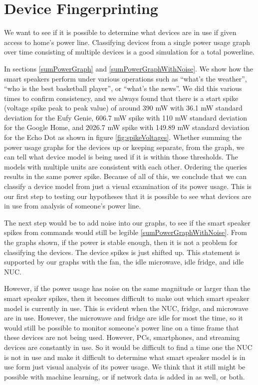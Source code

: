 \section{Device Fingerprinting}
We want to see if it is possible to determine what devices are in use if given access to home's power line. Classifying devices from a single power usage graph over time consisting of multiple devices is a good simulation for a total powerline.

In sections \ref{sumPowerGraph} and \ref{sumPowerGraphWithNoise}. We show how the smart speakers perform under various operations such as ``what's the weather'', ``who is the best basketball player'', or ``what's the news''. We did this various times to confirm consistency, and we always found that there is a start spike (voltage spike peak to peak value) of around 390 mW with 36.1 mW standard deviation for the Eufy Genie, 606.7 mW spike with 110 mW standard deviation for the Google Home, and 2026.7 mW spike with 149.89 mW standard deviation for the Echo Dot as shown in figure \ref{fig:spikeVoltages}. Whether summing the power usage graphs for the devices up or keeping separate, from the graph, we can tell what device model is being used if it is within those thresholds. The models with multiple units are consistent with each other. Ordering the queries results in the same power spike. Because of all of this, we conclude that we can classify a device model from just a visual examination of its power usage. This is our first step to testing our hypotheses that it is possible to see what devices are in use from analysis of someone's power line.

The next step would be to add noise into our graphs, to see if the smart speaker spikes from commands would still be legible \ref{sumPowerGraphWithNoise}. From the graphs shown, if the power is stable enough, then it is not a problem for classifying the devices. The device spikes is just shifted up. This statement is supported by our graphs with the fan, the idle microwave, idle fridge, and idle NUC.

However, if the power usage has noise on the same magnitude or larger than the smart speaker spikes, then it becomes difficult to make out which smart speaker model is currently in use. This is evident when the NUC, fridge, and microwave are in use. However, the microwave and fridge are idle for most the time, so it would still be possible to monitor someone's power line on a time frame that these devices are not being used. However, PCs, smartphones, and streaming devices are constantly in use. So it would be difficult to find a time one the NUC is not in use and make it difficult to determine what smart speaker model is in use form just visual analysis of its power usage. We think that it still might be possible with machine learning, or if network data is added in as well, or both.

